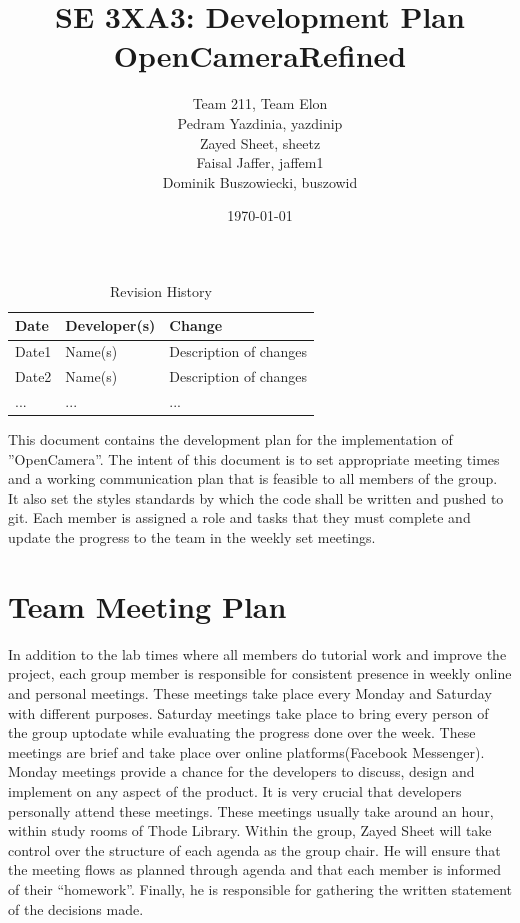 \documentclass{article}
\title{SE 3XA3: Development Plan\\OpenCameraRefined}
\author{Team 211, Team Elon
		\\ Pedram Yazdinia, yazdinip
		\\ Zayed Sheet, sheetz
		\\ Faisal Jaffer, jaffem1
		\\ Dominik Buszowiecki, buszowid 
}
\date{\today}
\begin{document}
\begin{table}[hp]
\caption{Revision History} \label{TblRevisionHistory}
\begin{tabularx}{\textwidth}{llX}
\toprule
\textbf{Date} & \textbf{Developer(s)} & \textbf{Change}\\
\midrule
Date1 & Name(s) & Description of changes\\
Date2 & Name(s) & Description of changes\\
... & ... & ...\\
\bottomrule
\end{tabularx}
\end{table}

\newpage

\maketitle


This document contains the development plan for the implementation of ''OpenCamera”. The intent of this document is to set appropriate meeting times and a working communication plan that is feasible to all members of the group. It also set the styles standards by which the code shall be written and pushed to git. Each member is assigned a role and tasks that they must complete and update the progress to the team in the weekly set meetings.


\section{Team Meeting Plan}

In addition to the lab times where all members do tutorial work and improve the project, each group member is responsible for consistent presence in weekly online and personal meetings. These meetings take place every Monday and Saturday with different purposes. Saturday meetings take place to bring every person of the group uptodate while evaluating the progress done over the week. These meetings are brief and take place over online platforms(Facebook Messenger). Monday meetings provide a chance for the developers to discuss, design and implement on any aspect of the product. It is very crucial that developers personally attend these meetings. These meetings usually take around an hour, within study rooms of Thode Library. Within the group, Zayed Sheet will take control over the structure of each agenda as the group chair. He will ensure that the meeting flows as planned through agenda and that each member is informed of their “homework”. Finally, he is responsible for gathering the written statement of the decisions made. 
\end{document}

